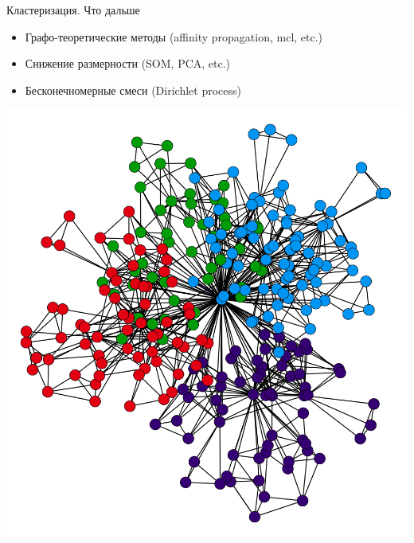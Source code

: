 \documentclass[10pt]{beamer}
\begin{document}
\begin{frame}{Кластеризация. Что дальше}

\begin{itemize}
\item Графо-теоретические методы (affinity propagation, mcl, etc.)
\item Снижение размерности (SOM, PCA, etc.)
\item Бесконечномерные смеси (Dirichlet process)
\end{itemize}

\begin{center}
\includegraphics[height=0.6\textheight]{images/graph.jpg}
\end{center}

\end{frame}
\end{document}
